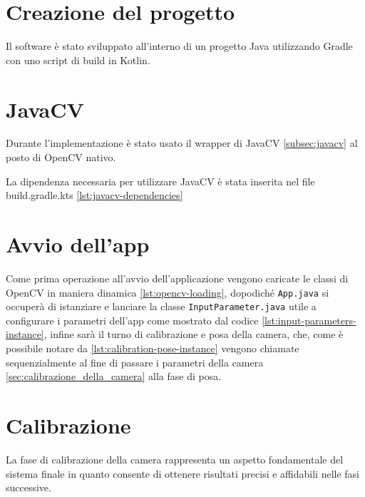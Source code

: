 \documentclass[12pt,a4paper,openright,twoside]{book}
\begin{document}
\section{Creazione del progetto}
Il software è stato sviluppato all'interno di un progetto Java utilizzando Gradle con uno script di build in Kotlin.

\section{JavaCV}
Durante l'implementazione è stato usato il wrapper di JavaCV \ref{subsec:javacv} al posto di OpenCV nativo.

La dipendenza necessaria per utilizzare JavaCV è stata inserita nel file build.gradle.kts \cref{lst:javacv-dependencies}


\section{Avvio dell'app}
Come prima operazione all'avvio dell'applicazione vengono caricate le classi di OpenCV in maniera dinamica \cref{lst:opencv-loading}, dopodiché \texttt{App.java} si occuperà di istanziare e lanciare la classe \texttt{InputParameter.java} utile a configurare i parametri dell'app come mostrato dal codice \cref{lst:input-parameters-instance}, infine sarà il turno di calibrazione e posa della camera, che, come è possibile notare da \cref{lst:calibration-pose-instance} vengono chiamate sequenzialmente al fine di passare i parametri della camera \ref{sec:calibrazione_della_camera} alla fase di posa.






\section{Calibrazione}
La fase di calibrazione della camera rappresenta un aspetto fondamentale del sistema finale in quanto consente di ottenere risultati precisi e affidabili nelle fasi successive.
\end{document}
